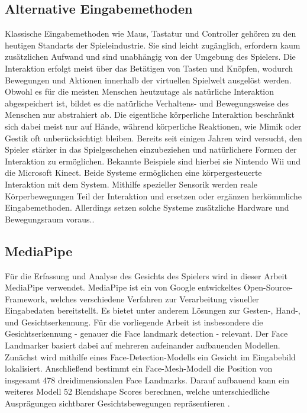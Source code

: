 \documentclass[intern]{cgMA}
\begin{document}
\subsection{Alternative Eingabemethoden}
Klassische Eingabemethoden wie Maus, Tastatur und Controller gehören zu den heutigen Standarts der Spieleindustrie. Sie sind leicht zugänglich, erfordern kaum zusätzlichen Aufwand und sind unabhängig von der Umgebung des Spielers. Die Interaktion erfolgt meist über das Betätigen von Tasten und Knöpfen, wodurch Bewegungen und Aktionen innerhalb der virtuellen Spielwelt ausgelöst werden. Obwohl es für die meisten Menschen heutzutage als natürliche Interaktion abgespeichert ist, bildet es die natürliche Verhaltens- und Bewegungsweise des Menschen nur abstrahiert ab. Die eigentliche körperliche Interaktion beschränkt sich dabei meist nur auf Hände, während körperliche Reaktionen, wie Mimik oder Gestik oft unberücksichtigt bleiben.
Bereits seit einigen Jahren wird versucht, den Spieler stärker in das Spielgeschehen einzubeziehen und natürlichere Formen der Interaktion zu ermöglichen. Bekannte Beispiele sind hierbei sie Nintendo Wii und die Microsoft Kinect. Beide Systeme ermöglichen eine körpergesteuerte Interaktion mit dem System. Mithilfe spezieller Sensorik werden reale Körperbewegungen Teil der Interaktion und ersetzen oder ergänzen herkömmliche Eingabemethoden. Allerdings setzen solche Systeme zusätzliche Hardware und Bewegungsraum voraus.\cite{wiiKinect}\cite{gilleade2005affective}.
\subsection{MediaPipe}
Für die Erfassung und Analyse des Gesichts des Spielers wird in dieser Arbeit MediaPipe verwendet. MediaPipe ist ein von Google entwickeltes Open-Source-Framework, welches verschiedene Verfahren zur Verarbeitung visueller Eingabedaten bereitstellt. Es bietet unter anderem Lösungen zur Gesten-, Hand-, und Gesichtserkennung. Für die vorliegende Arbeit ist insbesondere die Gesichtserkennung - genauer die Face landmark detection - relevant. Der Face Landmarker basiert dabei auf mehreren aufeinander aufbauenden Modellen. Zunächst wird mithilfe eines Face-Detection-Modells ein Gesicht im Eingabebild lokalisiert. Anschließend bestimmt ein Face-Mesh-Modell die Position von insgesamt 478 dreidimensionalen Face Landmarks. Darauf aufbauend kann ein weiteres Modell 52 Blendshape Scores berechnen, welche unterschiedliche Ausprägungen sichtbarer Gesichtsbewegungen repräsentieren \cite{google_mediapipe_face_landmarker}.\cite{emotionRecMediapipe}
\end{document}
